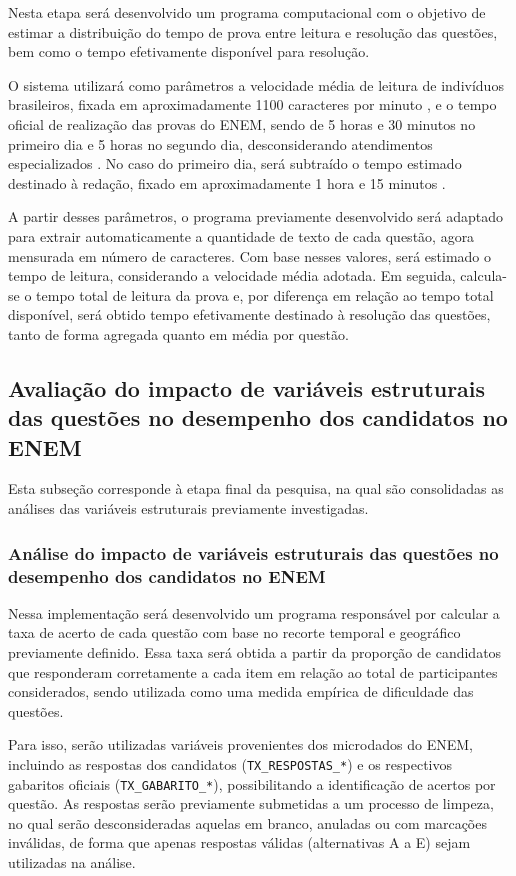 \documentclass[a4paper,10pt, twocolumn]{article}
\begin{document}
Nesta etapa será desenvolvido um programa computacional com o objetivo de estimar a distribuição do tempo de prova entre leitura e resolução das questões, bem como o tempo efetivamente disponível para resolução.

O sistema utilizará como parâmetros a velocidade média de leitura de indivíduos brasileiros, fixada em aproximadamente 1100 caracteres por minuto \cite{Messias2008}, e o tempo oficial de realização das provas do ENEM, sendo de 5 horas e 30 minutos no primeiro dia e 5 horas no segundo dia, desconsiderando atendimentos especializados \cite{inep_enem_servico}. No caso do primeiro dia, será subtraído o tempo estimado destinado à redação, fixado em aproximadamente 1 hora e 15 minutos \cite{brasil_escola_redacao_enem}.

A partir desses parâmetros, o programa previamente desenvolvido será adaptado para extrair automaticamente a quantidade de texto de cada questão, agora mensurada em número de caracteres. Com base nesses valores, será estimado o tempo de leitura, considerando a velocidade média adotada. Em seguida, calcula-se o tempo total de leitura da prova e, por diferença em relação ao tempo total disponível, será obtido tempo efetivamente destinado à resolução das questões, tanto de forma agregada quanto em média por questão.

\subsection{Avaliação do impacto de variáveis estruturais das questões no desempenho dos candidatos no ENEM}
\label{avaliacao-impacto-variaveis}
Esta subseção corresponde à etapa final da pesquisa, na qual são consolidadas as análises das variáveis estruturais previamente investigadas.

\subsubsection{Análise do impacto de variáveis estruturais das questões no desempenho dos candidatos no ENEM}
\label{analise-impacto-variaveis}
Nessa implementação será desenvolvido um programa responsável por calcular a taxa de acerto de cada questão com base no recorte temporal e geográfico previamente definido. Essa taxa será obtida a partir da proporção de candidatos que responderam corretamente a cada item em relação ao total de participantes considerados, sendo utilizada como uma medida empírica de dificuldade das questões.

Para isso, serão utilizadas variáveis provenientes dos microdados do ENEM, incluindo as respostas dos candidatos (\texttt{TX\_RESPOSTAS\_*}) e os respectivos gabaritos oficiais (\texttt{TX\_GABARITO\_*}), possibilitando a identificação de acertos por questão. As respostas serão previamente submetidas a um processo de limpeza, no qual serão desconsideradas aquelas em branco, anuladas ou com marcações inválidas, de forma que apenas respostas válidas (alternativas A a E) sejam utilizadas na análise.
\end{document}
